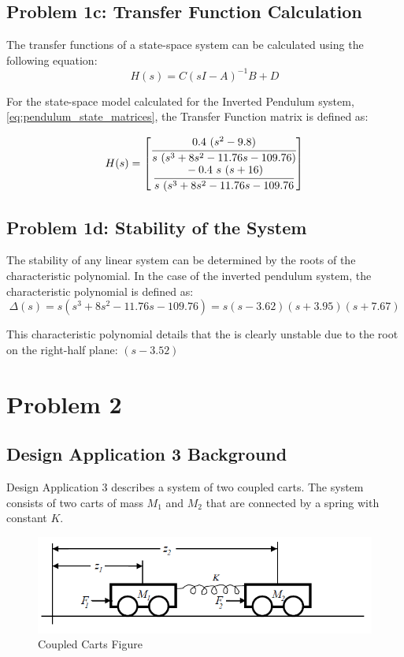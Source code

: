 \documentclass[]{article}
\begin{document}
	\subsection{Problem 1c: Transfer Function Calculation}
		The transfer functions of a state-space system can be calculated using the following equation:
		\begin{equation}
			H(s) = C (sI-A)^{-1} B + D
			\label{eq:tf_def}
		\end{equation}
		
		For the state-space model calculated for the Inverted Pendulum system, \eqref{eq:pendulum_state_matrices}, the Transfer Function matrix is defined as:
		
		\begin{equation}
			H(s) = \mqty[	\cfrac{0.4 \ (s^2 - 9.8)}{s \ (s^3 + 8s^2 - 11.76s - 109.76)}\\
							\cfrac{-0.4 \ s \ (s+16)}{s \ (s^3 + 8s^2 - 11.76s - 109.76}
							]
			\label{eq:pendulum_H(s)}
		\end{equation}
		
	\subsection{Problem 1d: Stability of the System}
		The stability of any linear system can be determined by the roots of the characteristic polynomial. In the case of the inverted pendulum system, the characteristic polynomial is defined as:
		\begin{equation}
			\Delta (s) = s (s^3 + 8s^2 - 11.76s - 109.76) = s (s-3.62) (s + 3.95) (s + 7.67)
			\label{eq:pendulum_Delta(s)}
		\end{equation}
		
		This characteristic polynomial details that the is clearly unstable due to the root on the right-half plane: $(s-3.52)$

	
\newpage
\section{Problem 2}
	\subsection{Design Application 3 Background}
		Design Application 3 describes a system of two coupled carts. The system consists of two carts of mass $M_1$ and $M_2$ that are connected by a spring with constant $K$.
		
		\begin{figure}[h]
			\centering
			\includegraphics[width=0.7\linewidth]{Fig/DesignApplication3}
			\caption{Coupled Carts Figure}
			\label{fig:designapplication3}
		\end{figure}
		
\end{document}
